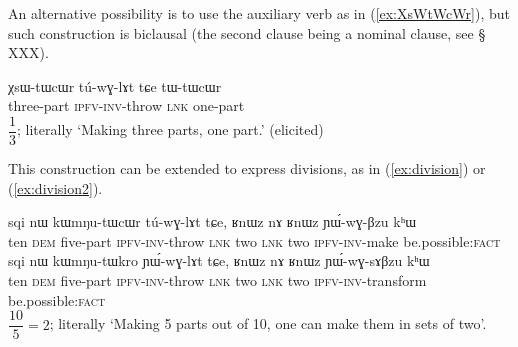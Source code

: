 An alternative possibility is to use the auxiliary verb  as in (\ref{ex:XsWtWcWr}), but such construction is biclausal (the second clause being a nominal clause, see § XXX).

\begin{exe}
\ex \label{ex:XsWtWcWr}
\gll χsɯ-tɯcɯr tú-wɣ-lɤt tɕe tɯ-tɯcɯr   \\
 three-part \textsc{ipfv}-\textsc{inv}-throw \textsc{lnk} one-part \\
\glt $\dfrac{1}{3}$; literally `Making three parts, one part.' (elicited)
\end{exe}

This construction can be  extended to express divisions, as in (\ref{ex:division}) or (\ref{ex:division2}).

\begin{exe}
\ex \label{ex:division}
\gll sqi nɯ kɯmŋu-tɯcɯr tú-wɣ-lɤt tɕe, ʁnɯz nɤ ʁnɯz ɲɯ́-wɣ-βzu kʰɯ \\
 ten \textsc{dem} five-part \textsc{ipfv}-\textsc{inv}-throw \textsc{lnk} two \textsc{lnk} two \textsc{ipfv}-\textsc{inv}-make be.possible:\textsc{fact} \\
 \ex \label{ex:division2}
\gll sqi nɯ kɯmŋu-tɯkro ɲɯ́-wɣ-lɤt tɕe, ʁnɯz nɤ ʁnɯz ɲɯ́-wɣ-sɤβzu kʰɯ \\
 ten \textsc{dem} five-part \textsc{ipfv}-\textsc{inv}-throw \textsc{lnk} two \textsc{lnk} two \textsc{ipfv}-\textsc{inv}-transform be.possible:\textsc{fact} \\
\glt $\dfrac{10}{5}=2$; literally `Making 5 parts out of 10, one can make them in sets of two'.
\end{exe}

 
